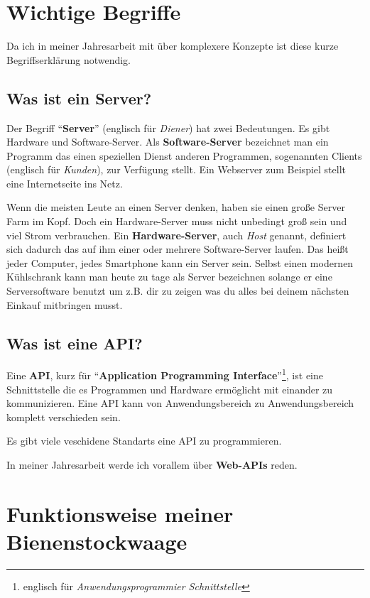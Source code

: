\documentclass[ngerman,12pt]{scrartcl}
\begin{document}
\section{Wichtige Begriffe}
Da ich in meiner Jahresarbeit mit über komplexere Konzepte ist diese kurze Begriffserklärung notwendig.

\subsection{Was ist ein Server?}
Der Begriff \enquote{\textbf{Server}} (englisch für \textit{Diener}) hat zwei Bedeutungen.
Es gibt Hardware und Soft\-ware-Ser\-ver.
Als \textbf{Soft\-ware-Ser\-ver} bezeichnet man ein Programm das einen speziellen Dienst anderen Programmen, sogenannten Clients (englisch für \textit{Kunden}), zur Verfügung stellt.
Ein Webserver zum Beispiel stellt eine Internetseite ins Netz.~\cite[ver.][]{IonosServer}

Wenn die meisten Leute an einen Server denken, haben sie einen große Server Farm im Kopf.
Doch ein Hard\-ware-Ser\-ver muss nicht unbedingt groß sein und viel Strom verbrauchen.
Ein \textbf{Hard\-ware-Ser\-ver}, auch \textit{Host} genannt, definiert sich dadurch das auf ihm einer oder mehrere Soft\-ware-Ser\-ver laufen. Das heißt jeder Computer, jedes Smartphone kann ein Server sein.
Selbst einen modernen Kühlschrank kann man heute zu tage als Server bezeichnen solange er eine Serversoftware benutzt um z.B. dir zu zeigen was du alles bei deinem nächsten Einkauf mitbringen musst.

\subsection{Was ist eine API?}\label{sec:api}

Eine \textbf{API}, kurz für \enquote{\textbf{Application Programming Interface}}\footnote{englisch für \textit{Anwendungsprogrammier Schnittstelle}}, ist eine Schnittstelle die es Programmen und Hardware ermöglicht mit einander zu kommunizieren.
Eine API kann von Anwendungsbereich zu Anwendungsbereich komplett verschieden sein.~\cite{GSApi}


Es gibt viele veschidene Standarts eine API zu programmieren.

In meiner Jahresarbeit werde ich vorallem über \textbf{Web-APIs} reden.

\section{Funktionsweise meiner Bienenstockwaage}
\end{document}
